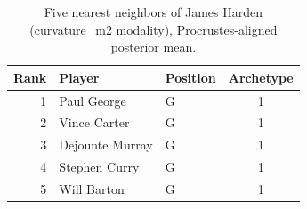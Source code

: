 \begin{table}[htbp]
  \centering\small
  \begin{tabular}{rllc}
    \toprule
    Rank & Player & Position & Archetype \\
    \midrule
    1 & Paul George & G & 1 \\
    2 & Vince Carter & G & 1 \\
    3 & Dejounte Murray & G & 1 \\
    4 & Stephen Curry & G & 1 \\
    5 & Will Barton & G & 1 \\
    \bottomrule
  \end{tabular}
  \caption{Five nearest neighbors of James Harden (curvature_m2 modality), Procrustes-aligned posterior mean.}
  \label{tab:James_Harden_neighbors_curvature_m2}
\end{table}

